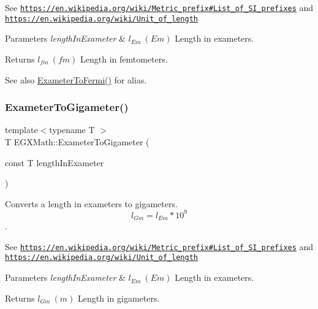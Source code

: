 See \href{https://en.wikipedia.org/wiki/Metric_prefix#List_of_SI_prefixes}{\tt https\+://en.\+wikipedia.\+org/wiki/\+Metric\+\_\+prefix\#\+List\+\_\+of\+\_\+\+S\+I\+\_\+prefixes} and \href{https://en.wikipedia.org/wiki/Unit_of_length}{\tt https\+://en.\+wikipedia.\+org/wiki/\+Unit\+\_\+of\+\_\+length} 
\begin{DoxyParams}{Parameters}
{\em length\+In\+Exameter} & $ l_{Em}\ (Em)$ Length in exameters. \\
\hline
\end{DoxyParams}
\begin{DoxyReturn}{Returns}
$ l_{fm}\ (fm)$ Length in femtometers. 
\end{DoxyReturn}
\begin{DoxySeeAlso}{See also}
\mbox{\hyperlink{group___e_g_x_math-_conversions-_length_conversions-_exameter-_non-_s_i_ga0aa0524461cbce1fcc102b847545d212}{Exameter\+To\+Fermi()}} for alias. 
\end{DoxySeeAlso}
\mbox{\label{group___e_g_x_math-_conversions-_length_conversions-_exameter-_s_i_gae0a019ba27e962c891f014ae4748fd14}} 
\subsubsection{\texorpdfstring{Exameter\+To\+Gigameter()}{ExameterToGigameter()}}
{\footnotesize\ttfamily template$<$typename T $>$ \\
T E\+G\+X\+Math\+::\+Exameter\+To\+Gigameter (\begin{DoxyParamCaption}\item[{const T}]{length\+In\+Exameter }\end{DoxyParamCaption})}



Converts a length in exameters to gigameters. \[ l_{Gm}=l_{Em} * 10^{9} \]. 

See \href{https://en.wikipedia.org/wiki/Metric_prefix#List_of_SI_prefixes}{\tt https\+://en.\+wikipedia.\+org/wiki/\+Metric\+\_\+prefix\#\+List\+\_\+of\+\_\+\+S\+I\+\_\+prefixes} and \href{https://en.wikipedia.org/wiki/Unit_of_length}{\tt https\+://en.\+wikipedia.\+org/wiki/\+Unit\+\_\+of\+\_\+length} 
\begin{DoxyParams}{Parameters}
{\em length\+In\+Exameter} & $ l_{Em}\ (Em)$ Length in exameters. \\
\hline
\end{DoxyParams}
\begin{DoxyReturn}{Returns}
$ l_{Gm}\ (m)$ Length in gigameters. 
\end{DoxyReturn}
\mbox{\label{group___e_g_x_math-_conversions-_length_conversions-_exameter-_s_i_gaa8f58d36da35b834499715694c75ce99}} 
